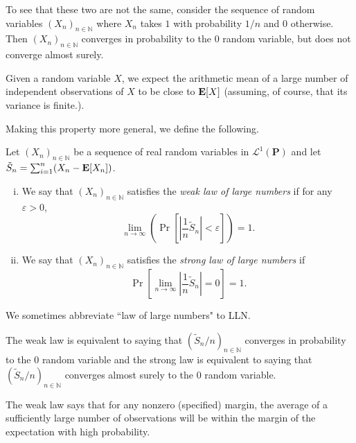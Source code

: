 To see that these two are not the same, consider the sequence of random variables $(X_n)_{n\in\mathbb{N}}$ where $X_n$ takes $1$ with probability $1/n$ and $0$ otherwise. Then $(X_n)_{n\in\mathbb{N}}$ converges in probability to the $0$ random variable, but does not converge almost surely.

\vspace{2mm}
Given a random variable $X$, we expect the arithmetic mean of a large number of independent observations of $X$ to be close to $\textbf{E}[X]$ (assuming, of course, that its variance is finite.).

\vspace{1mm}
Making this property more general, we define the following.

\begin{fdef}
    Let $(X_n)_{n\in\mathbb{N}}$ be a sequence of real random variables in $\mathcal{L}^1(\textbf{P})$ and let $\tilde{S}_n=\sum_{i=1}^n (X_n-\textbf{E}[X_n])$.
    \begin{enumerate}[(i)]
        \item We say that $(X_n)_{n\in\mathbb{N}}$ satisfies the \textit{weak law of large numbers} if for any $\varepsilon>0$,
        $$\lim_{n\to\infty}\left(\Pr\left[\left|\frac{1}{n}\tilde{S}_n\right| < \varepsilon\right]\right)=1.$$
        
        \item We say that $(X_n)_{n\in\mathbb{N}}$ satisfies the \textit{strong law of large numbers} if
        $$\Pr\left[\lim_{n\to\infty}\left|\frac{1}{n}\tilde{S}_n\right|=0\right]=1.$$
    \end{enumerate}
\end{fdef}

We sometimes abbreviate ``law of large numbers" to LLN.

The weak law is equivalent to saying that $(\tilde{S}_n/n)_{n\in\mathbb{N}}$ converges in probability to the $0$ random variable and the strong law is equivalent to saying that $(\tilde{S}_n/n)_{n\in\mathbb{N}}$ converges almost surely to the $0$ random variable.

\vspace{2mm}
The weak law says that for any nonzero (specified) margin, the average of a sufficiently large number of observations will be within the margin of the expectation with high probability.

